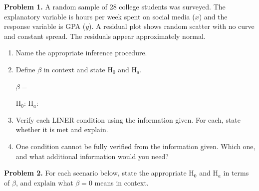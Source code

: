 \documentclass[10pt]{article}
\begin{document}
\namedateperiod

\vspace{0.1in}

\textbf{Problem 1.} A random sample of 28 college students was surveyed. The
explanatory variable is hours per week spent on social media ($x$) and the response
variable is GPA ($y$). A residual plot shows random scatter with no curve and constant
spread. The residuals appear approximately normal.

\begin{enumerate}[label=\alph*.]

  \item Name the appropriate inference procedure.


  \item Define $\beta$ in context and state H$_0$ and H$_a$.

        $\beta = $ \writeline

        H$_0$: \blank{8cm} \quad H$_a$: \blank{8cm}

  \item Verify each LINER condition using the information given. For each, state
        whether it is met and explain.


  \item One condition cannot be fully verified from the information given. Which
        one, and what additional information would you need?


\end{enumerate}

\vspace{0.1in}

\textbf{Problem 2.} For each scenario below, state the appropriate H$_0$ and H$_a$
in terms of $\beta$, and explain what $\beta = 0$ means in context.
\end{document}
